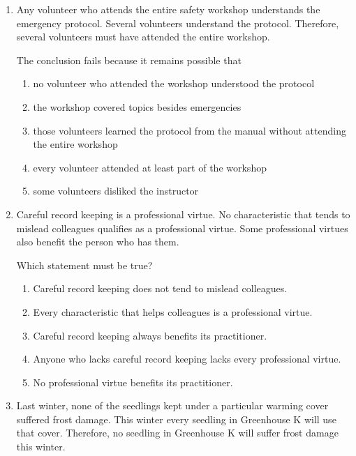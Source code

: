 \begin{enumerate}
\item Any volunteer who attends the entire safety workshop understands the emergency protocol. Several volunteers understand the protocol. Therefore, several volunteers must have attended the entire workshop.

The conclusion fails because it remains possible that
\begin{enumerate}
\item no volunteer who attended the workshop understood the protocol
\item the workshop covered topics besides emergencies
\item those volunteers learned the protocol from the manual without attending the entire workshop
\item every volunteer attended at least part of the workshop
\item some volunteers disliked the instructor
\end{enumerate}

\item Careful record keeping is a professional virtue. No characteristic that tends to mislead colleagues qualifies as a professional virtue. Some professional virtues also benefit the person who has them.

Which statement must be true?
\begin{enumerate}
\item Careful record keeping does not tend to mislead colleagues.
\item Every characteristic that helps colleagues is a professional virtue.
\item Careful record keeping always benefits its practitioner.
\item Anyone who lacks careful record keeping lacks every professional virtue.
\item No professional virtue benefits its practitioner.
\end{enumerate}

\item Last winter, none of the seedlings kept under a particular warming cover suffered frost damage. This winter every seedling in Greenhouse K will use that cover. Therefore, no seedling in Greenhouse K will suffer frost damage this winter.


\end{enumerate}
